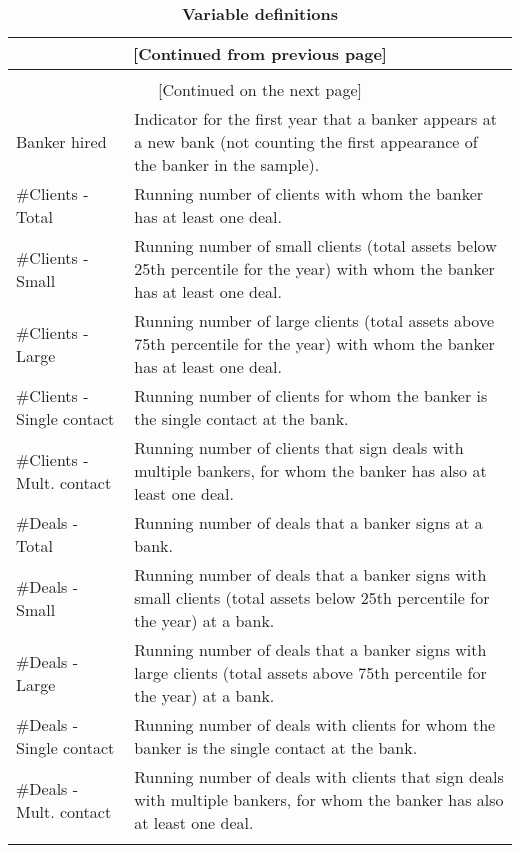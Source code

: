 

\begin{landscape} 
\onehalfspacing

\begin{longtable}[c]{p{} p{} }
	\caption{ \textbf{Variable definitions} \label{tab:definitions} }\\
 	\endfirsthead
 
	\multicolumn{2}{c}{ [Continued from previous page] }\\
	\endhead
 	
	\midrule \\ \multicolumn{2}{c}{[Continued on the next page]}	
	\endfoot 

	\bottomrule
 	\endlastfoot

 	\multicolumn{2}{l}{\textbf{Panel A:} Bankers' client portfolio} \\
 	\midrule
 	Banker hired & Indicator for the first year that a banker appears at a new bank (not counting the first appearance of the banker in the sample). \\
 	\#Clients - Total & Running number of clients with whom the banker has at least one deal. \\
 	\#Clients - Small & Running number of small clients (total assets below 25th percentile for the year) with whom the banker has at least one deal. \\
	\#Clients - Large & Running number of large clients (total assets above 75th percentile for the year) with whom the banker has at least one deal. \\
	\#Clients - Single contact & Running number of clients for whom the banker is the single contact at the bank. \\
	\#Clients - Mult. contact & Running number of clients that sign deals with multiple bankers, for whom the banker has also at least one deal. \\
	\#Deals - Total & Running number of deals that a banker signs at a bank. \\
	\#Deals - Small & Running number of deals that a banker signs with small clients (total assets below 25th percentile for the year) at a bank. \\
	\#Deals - Large & Running number of deals that a banker signs with large clients (total assets above 75th percentile for the year) at a bank. \\
	\#Deals - Single contact & Running number of deals with clients for whom the banker is the single contact at the bank. \\
	\#Deals - Mult. contact & Running number of deals with clients that sign deals with multiple bankers, for whom the banker has also at least one deal. \\
	\pagebreak


\end{longtable}
\end{landscape}
